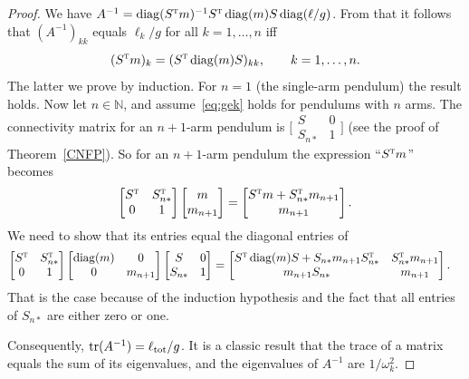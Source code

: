 \documentclass[12pt]{article}
\newcommand{\T}{\textsc{t}}
\theoremstyle{sfdefinition}%
\theoremstyle{sfdefinition}
\DeclareMathOperator{\tr}{tr}
\newcommand{\mymatrix}[1]{\begin{bmatrix} #1 \end{bmatrix}}
\newcommand{\smat}[1]{\bigl[\begin{smallmatrix} #1 
                            \end{smallmatrix}\bigr]}
\DeclareMathOperator{\diag}{diag}
\begin{document}
\begin{proof}
  We have $A^{-1}=\diag(S^{\T}m)^{-1}S^\T\diag(m)S\diag(\ell/g)$. From
  that it follows that $(A^{-1})_{kk}$ equals $\ell_k/g$ for all
  $k=1,\ldots,n$ iff
  \begin{equation}\label{eq:gek}
    (S^{\T}m)_k = (S^{\T}\diag(m)S)_{kk}, \qquad k=1,\ldots,n.
  \end{equation}
  The latter we prove by induction. For $n=1$ (the single-arm
  pendulum) the result holds. Now let $n\in\mathbb{N}$, and
  assume~\eqref{eq:gek} holds for pendulums with $n$ arms. The
  connectivity matrix for an $n+1$-arm pendulum is
  $\smat{S&0\\ S_{n*}&1}$ (see the proof of Theorem~\ref{CNFP}). So
  for an $n+1$-arm pendulum the expression ``$S^{\T}m$'' becomes
  \[
    \mymatrix{S^{\T} & S_{n*}^{\T}\\ 0 & 1}
    \mymatrix{m\\ m_{n+1}}
    =
    \mymatrix{S^{\T}m + S_{n*}^{\T}m_{n+1}\\ m_{n+1}}. 
  \]
  We need to show that its entries equal the diagonal entries of
  \begin{align*}
    \mymatrix{S^{\T} & S_{n*}^{\T}\\ 0 & 1}
    &
    \mymatrix{\diag(m)&0\\0&m_{n+1}} \mymatrix{S & 0 \\ S_{n*} & 1}
    =
    \mymatrix{S^{\T}\diag(m)S+S_{n*}m_{n+1}S_{n*}^{\T}& S_{n*}^{\T}m_{n+1}\\
        m_{n+1}S_{n*} & m_{n+1}}.
  \end{align*}
  That is the case because of the induction hypothesis and the fact
  that all entries of $S_{n*}$ are either zero or one.

  Consequently, $\tr(A^{-1})=\ell_{\rm tot}/g$. It is a classic result
  that the trace of a matrix equals the sum of its eigenvalues, and
  the eigenvalues of $A^{-1}$ are $1/\omega_k^2$.
\end{proof}
\end{document}
